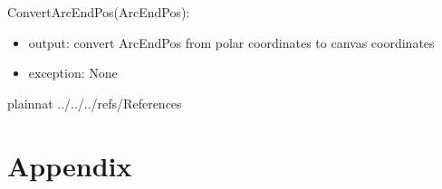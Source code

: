 \documentclass[12pt, titlepage]{article}
\begin{document}
\noindent ConvertArcEndPos(ArcEndPos):
\begin{itemize}
	\item output: convert ArcEndPos from polar coordinates to canvas coordinates 
	\item exception: None 
\end{itemize}

\newpage

 {plainnat}
 {../../../refs/References}

\newpage

\section{Appendix} \label{Appendix}

\end{document}
